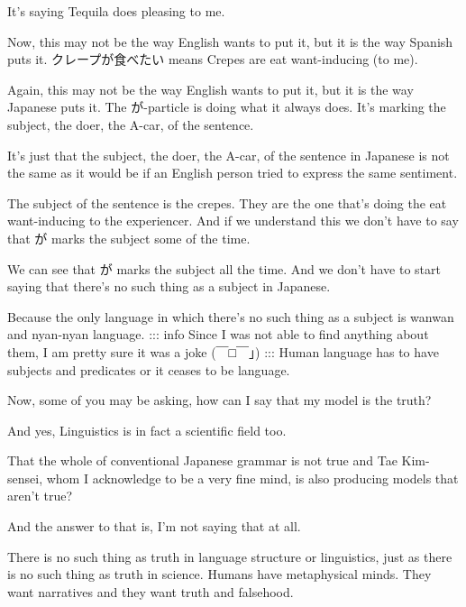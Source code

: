 It's saying Tequila does pleasing to me.

{}

Now, this may not be the way English wants to put it, but it is the way Spanish puts it. クレープが食べたい means Crepes are eat want-inducing (to me).

{}

Again, this may not be the way English wants to put it, but it is the way Japanese puts it. The が-particle is doing what it always does. It's marking the subject, the doer, the A-car, of the sentence.

It's just that the subject, the doer, the A-car, of the sentence in Japanese is not the same as it would be if an English person tried to express the same sentiment.

{}

The subject of the sentence is the crepes. They are the one that's doing the eat want-inducing to the experiencer. And if we understand this we don't have to say that が marks the subject some of the time.

We can see that が marks the subject all the time. And we don't have to start saying that there's no such thing as a subject in Japanese.

Because the only language in which there's no such thing as a subject is wanwan and nyan-nyan language. ::: info Since I was not able to find anything about them, I am pretty sure it was a joke (￣□￣」) ::: Human language has to have subjects and predicates or it ceases to be language.

\stopsectionlevel

\startsectionlevel[title={The Metaphysical Trap},reference={the-metaphysical-trap}]

Now, some of you may be asking, how can I say that my model is the truth?

{}

And yes, Linguistics is in fact a scientific field too.

That the whole of conventional Japanese grammar is not true and Tae Kim-sensei, whom I acknowledge to be a very fine mind, is also producing models that aren't true?

And the answer to that is, I'm not saying that at all.

\thinrule

There is no such thing as truth in language structure or linguistics, just as there is no such thing as truth in science. Humans have metaphysical minds. They want narratives and they want truth and falsehood.

